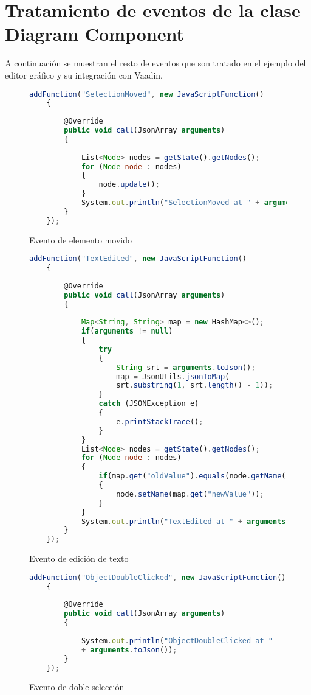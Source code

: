 \appendix
\chapter{Tratamiento de eventos de la clase Diagram Component}\label{sec:aped.A}
A continuación se muestran el resto de eventos que son tratado en el ejemplo del editor gráfico y su integración con Vaadin.

\begin{figure}[H]
	\centering
	\begin{lstlisting}[language=Javascript]
	addFunction("SelectionMoved", new JavaScriptFunction()
	{
	
		@Override
		public void call(JsonArray arguments)
		{
		
			List<Node> nodes = getState().getNodes();
			for (Node node : nodes)
			{
				node.update();
			}
			System.out.println("SelectionMoved at " + arguments.toJson());
		}
	});\end{lstlisting}
	\caption{Evento de elemento movido}
	\label{fig:selectionMoved}
\end{figure}


\begin{figure}[H]
	\centering
	\begin{lstlisting}[language=Javascript]
	addFunction("TextEdited", new JavaScriptFunction()
	{
	
		@Override
		public void call(JsonArray arguments)
		{
		
			Map<String, String> map = new HashMap<>();
			if(arguments != null)
			{
				try
				{
					String srt = arguments.toJson();
					map = JsonUtils.jsonToMap(
					srt.substring(1, srt.length() - 1));
				}
				catch (JSONException e)
				{
					e.printStackTrace();
				}
			}
			List<Node> nodes = getState().getNodes();
			for (Node node : nodes)
			{
				if(map.get("oldValue").equals(node.getName()))
				{
					node.setName(map.get("newValue"));
				}	
			}
			System.out.println("TextEdited at " + arguments.toJson());
		}
	});\end{lstlisting}
	\caption{Evento de edición de texto}
	\label{fig:textEdited}
\end{figure}


\begin{figure}[H]
	\centering
	\begin{lstlisting}[language=Javascript]
	addFunction("ObjectDoubleClicked", new JavaScriptFunction()
	{
	
		@Override
		public void call(JsonArray arguments)
		{
		
			System.out.println("ObjectDoubleClicked at " 
			+ arguments.toJson());
		}
	});\end{lstlisting}
	\caption{Evento de doble selección}
	\label{fig:doubleClick}
\end{figure}
